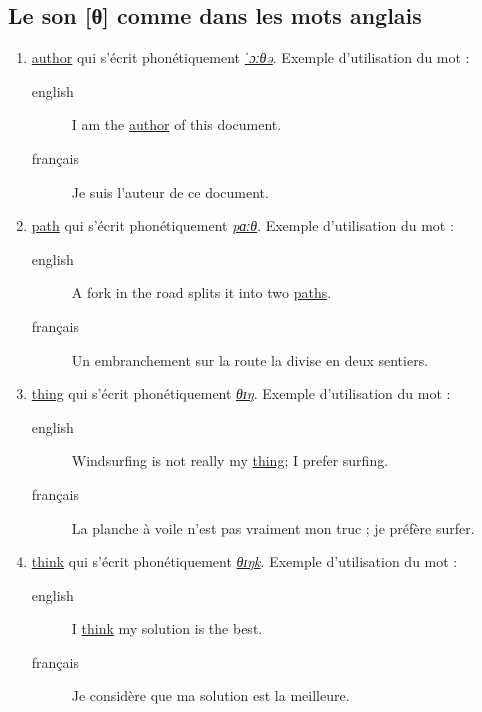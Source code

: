 \documentclass[12pt,a4paper]{book}
\begin{document}
\subsection{Le son [θ] comme dans les mots anglais}
\label{sec:org4f7f160}
\begin{enumerate}
\item \href{http://www.wordreference.com/enfr/author}{author} qui s'écrit phonétiquement \href{https://en.oxforddictionaries.com/definition/author}{\emph{ˈɔːθə}}. Exemple d'utilisation du mot :
\begin{description}
\item[{english}] \textenglish{I am the \href{https://youtu.be/lyGivD8aJi4}{author} of this document.}
\item[{français}] Je suis l'auteur de ce document.
\end{description}
\item \href{http://www.wordreference.com/enfr/path}{path} qui s'écrit phonétiquement \href{https://en.oxforddictionaries.com/definition/path}{\emph{pɑːθ}}. Exemple d'utilisation du mot :
\begin{description}
\item[{english}] \textenglish{A fork in the road splits it into two \href{https://youtu.be/EZdFE-nnyyQ}{paths}.}
\item[{français}] Un embranchement sur la route la divise en deux
sentiers.
\end{description}
\item \href{http://www.wordreference.com/enfr/thing}{thing} qui s'écrit phonétiquement \href{https://en.oxforddictionaries.com/definition/thing}{\emph{θɪŋ}}. Exemple d'utilisation du mot :
\begin{description}
\item[{english}] \textenglish{Windsurfing is not really my \href{https://youtu.be/h-pmsrw8XNE}{thing}; I prefer surfing.}
\item[{français}] La planche à voile n'est pas vraiment mon truc ; je
préfère surfer.
\end{description}
\item \href{http://www.wordreference.com/enfr/think}{think} qui s'écrit phonétiquement \href{https://en.oxforddictionaries.com/definition/think}{\emph{θɪŋk}}. Exemple d'utilisation du mot :
\begin{description}
\item[{english}] \textenglish{I \href{https://youtu.be/PpD8OvMTRiE}{think} my solution is the best.}
\item[{français}] Je considère que ma solution est la meilleure.
\end{description}
\end{enumerate}
\end{document}
